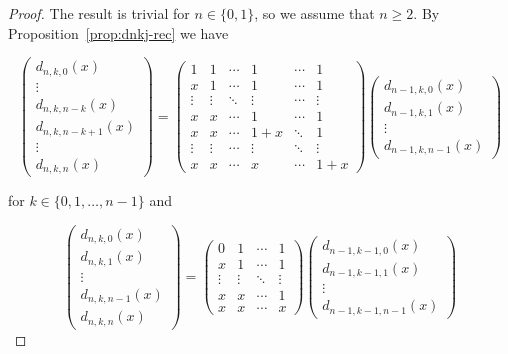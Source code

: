 \documentclass[11pt]{amsart}
\begin{document}
\begin{proof}
The result is trivial for $n \in \{0, 1\}$, so 
we assume that $n \ge 2$. By 
Proposition~\ref{prop:dnkj-rec} we have 

\[ \begin{pmatrix} 
   d_{n,k,0}(x) \\ \vdots \\ d_{n,k,n-k}(x) \\ 
	 d_{n,k,n-k+1}(x) \\ \vdots \\ d_{n,k,n}(x) 
	 \end{pmatrix} = 
   \begin{pmatrix} 
	 1 & 1 & \cdots & 1 & \cdots & 1 \\ 
   x & 1 & \cdots & 1 & \cdots & 1 \\ 
	 \vdots & \vdots & \ddots & \vdots & \cdots & 
	 \vdots \\ 
	 x & x & \cdots & 1 & \cdots & 1 \\ 
	 x & x & \cdots & 1+x & \ddots & 1 \\ 
	 \vdots & \vdots & \cdots & \vdots & \ddots &
	 \vdots \\ x & x & \cdots & x & \cdots & 1+x
	\end{pmatrix}
  \begin{pmatrix} 
  d_{n-1,k,0}(x) \\ d_{n-1,k,1}(x) \\ \vdots 
	\\ d_{n-1,k,n-1}(x) 
	\end{pmatrix} \]

\medskip
\noindent
for $k \in \{0, 1,\dots,n-1\}$ and 

\[ \begin{pmatrix} 
   d_{n,k,0}(x) \\ d_{n,k,1}(x) \\ \vdots \\ 
   d_{n,k,n-1}(x) \\ d_{n,k,n}(x) 
	 \end{pmatrix} = 
   \begin{pmatrix} 
	 0 & 1 & \cdots & 1 \\ 
   x & 1 & \cdots & 1 \\ 
	 \vdots & \vdots & \ddots & \vdots \\ 
	 x & x & \cdots & 1 \\ x & x & \cdots & x
	\end{pmatrix}
  \begin{pmatrix} 
  d_{n-1,k-1,0}(x) \\ d_{n-1,k-1,1}(x) \\ \vdots 
	\\ d_{n-1,k-1,n-1}(x) 
	\end{pmatrix} \]


\end{proof}
\end{document}
